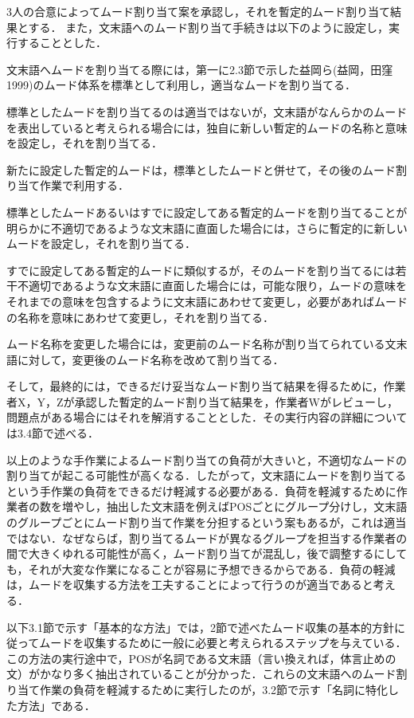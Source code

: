 \documentclass[japanese]{jnlp_1.4}
\newcommand{\InHone}[1]{}
\begin{document}
\InHone{(3)} 
3人の合意によってムード割り当て案を承認し，それを暫定的ムード割り当て結果とする．
また，文末語へのムード割り当て手続きは以下のように設定し，実行することとした．

\InHone{(a)} 文末語へムードを割り当てる際には，第一に2.3節で示した益岡ら(益岡，田窪 
1999)のムード体系を標準として利用し，適当なムードを割り当てる．

\InHone{(b)} 
標準としたムードを割り当てるのは適当ではないが，文末語がなんらかのムードを表出していると考えられる場合には，独自に新しい暫定的ムードの名称と意味を設定し，それを割り当てる．

\InHone{(c)} 
新たに設定した暫定的ムードは，標準としたムードと併せて，その後のムード割り当て作業で利用する．

\InHone{(d)} 
標準としたムードあるいはすでに設定してある暫定的ムードを割り当てることが明らかに不適切であるような文末語に直面した場合には，さらに暫定的に新しいムードを設定し，それを割り当てる．

\InHone{(e)} 
すでに設定してある暫定的ムードに類似するが，そのムードを割り当てるには若干不適切であるような文末語に直面した場合には，可能な限り，ムードの意味をそれまでの意味を包含するように文末語にあわせて変更し，必要があればムードの名称を意味にあわせて変更し，それを割り当てる．

\InHone{(f)} 
ムード名称を変更した場合には，変更前のムード名称が割り当てられている文末語に対して，変更後のムード名称を改めて割り当てる．

そして，最終的には，できるだけ妥当なムード割り当て結果を得るために，作業者X，Y，Zが承認した暫定的ムード割り当て結果を，作業者Wがレビューし，問題点がある場合にはそれを解消することとした．その実行内容の詳細については3.4節で述べる．

以上のような手作業によるムード割り当ての負荷が大きいと，不適切なムードの割り当てが起こる可能性が高くなる．したがって，文末語にムードを割り当てるという手作業の負荷をできるだけ軽減する必要がある．負荷を軽減するために作業者の数を増やし，抽出した文末語を例えばPOSごとにグループ分けし，文末語のグループごとにムード割り当て作業を分担するという案もあるが，これは適当ではない．なぜならば，割り当てるムードが異なるグループを担当する作業者の間で大きくゆれる可能性が高く，ムード割り当てが混乱し，後で調整するにしても，それが大変な作業になることが容易に予想できるからである．負荷の軽減は，ムードを収集する方法を工夫することによって行うのが適当であると考える．

以下3.1節で示す「基本的な方法」では，2節で述べたムード収集の基本的方針に従ってムードを収集するために一般に必要と考えられるステップを与えている．この方法の実行途中で，POSが名詞である文末語（言い換えれば，体言止めの文）がかなり多く抽出されていることが分かった．これらの文末語へのムード割り当て作業の負荷を軽減するために実行したのが，3.2節で示す「名詞に特化した方法」である．
\end{document}
